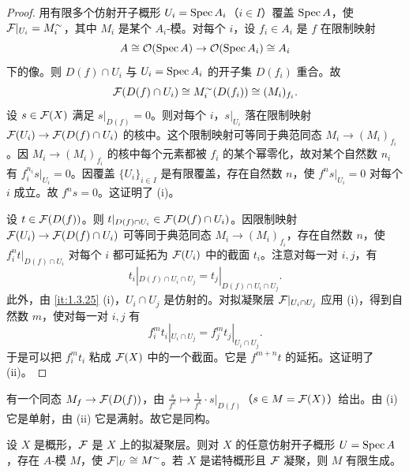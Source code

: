 \begin{proof}
用有限多个仿射开子概形 $U_i=\operatorname{Spec} A_i$（$i\in I$）覆盖 $\operatorname{Spec} A$，使 $\mathcal{F}|_{U_i}=M_i^\sim$，其中 $M_i$ 是某个 $A_i$-模。对每个 $i$，设 $f_i\in A_i$ 是 $f$ 在限制映射
\[
A\cong\mathcal{O}(\operatorname{Spec} A)\to\mathcal{O}(\operatorname{Spec} A_i)\cong A_i
\]
下的像。则 $D(f)\cap U_i$ 与 $U_i=\operatorname{Spec} A_i$ 的开子集 $D(f_i)$ 重合。故
\[
\mathcal{F}(D(f)\cap U_i)\cong M_i^\sim(D(f_i))\cong(M_i)_{f_i}.
\]
设 $s\in\mathcal{F}(X)$ 满足 $s|_{D(f)}=0$。则对每个 $i$，$s|_{U_i}$ 落在限制映射 $\mathcal{F}(U_i)\to\mathcal{F}(D(f)\cap U_i)$ 的核中。这个限制映射可等同于典范同态 $M_i\to(M_i)_{f_i}$。因 $M_i\to(M_i)_{f_i}$ 的核中每个元素都被 $f_i$ 的某个幂零化，故对某个自然数 $n_i$ 有 $f_i^{n_i}s|_{U_i}=0$。因覆盖 $\{U_i\}_{i\in I}$ 是有限覆盖，存在自然数 $n$，使 $f^ns|_{U_i}=0$ 对每个 $i$ 成立。故 $f^ns=0$。这证明了 (i)。

设 $t\in\mathcal{F}(D(f))$。则 $t|_{D(f)\cap U_i}\in\mathcal{F}(D(f)\cap U_i)$。因限制映射 $\mathcal{F}(U_i)\to\mathcal{F}(D(f)\cap U_i)$ 可等同于典范同态 $M_i\to(M_i)_{f_i}$，存在自然数 $n$，使 $f_i^nt|_{D(f)\cap U_i}$ 对每个 $i$ 都可延拓为 $\mathcal{F}(U_i)$ 中的截面 $t_i$。注意对每一对 $i,j$，有
\[
t_i|_{D(f)\cap U_i\cap U_j}=t_j|_{D(f)\cap U_i\cap U_j}.
\]
此外，由 \ref{it:1.3.25} (i)，$U_i\cap U_j$ 是仿射的。对拟凝聚层 $\mathcal{F}|_{U_i\cap U_j}$ 应用 (i)，得到自然数 $m$，使对每一对 $i,j$ 有
\[
f_i^mt_i|_{U_i\cap U_j}=f_j^mt_j|_{U_i\cap U_j}.
\]
于是可以把 $f_i^mt_i$ 粘成 $\mathcal{F}(X)$ 中的一个截面。它是 $f^{m+n}t$ 的延拓。这证明了 (ii)。
\end{proof}

有一个同态 $M_f\to\mathcal{F}(D(f))$，由 $\frac{s}{f^k}\mapsto\frac{1}{f^k}\cdot s|_{D(f)}$（$s\in M=\mathcal{F}(X)$）给出。由 (i) 它是单射，由 (ii) 它是满射。故它是同构。

\begin{proposition}\label{it:1.4.5}
设 $X$ 是概形，$\mathcal{F}$ 是 $X$ 上的拟凝聚层。则对 $X$ 的任意仿射开子概形 $U=\operatorname{Spec} A$，存在 $A$-模 $M$，使 $\mathcal{F}|_U\cong M^\sim$。若 $X$ 是诺特概形且 $\mathcal{F}$ 凝聚，则 $M$ 有限生成。
\end{proposition}

